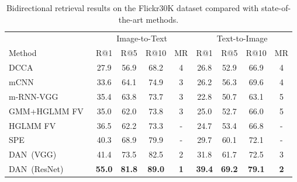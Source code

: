 \documentclass[10pt,twocolumn,letterpaper]{article}
\begin{document}
\begin{table*}
\caption{
Bidirectional retrieval results on the Flickr30K dataset compared with state-of-the-art methods.
}
\vspace{-2mm}
  \centering
  \begin{tabular}{lcccccccc}
    \toprule
	& \multicolumn{4}{c}{Image-to-Text}
	& \multicolumn{4}{c}{Text-to-Image} \\
    \cmidrule(lr){2-5} \cmidrule(lr){6-9}
	{Method}
	& {R@1} & {R@5} & {R@10} & {MR}
	& {R@1} & {R@5} & {R@10} & {MR}  \\
    \midrule
	{DCCA~\cite{yan2015deep}}
	& {27.9} & {56.9} & {68.2} & {4}
	& {26.8} & {52.9} & {66.9} & {4} \\
	{mCNN~\cite{ma2015multimodal}}
	& {33.6} & {64.1} & {74.9} & {3}
	& {26.2} & {56.3} & {69.6} & {4} \\
	{m-RNN-VGG~\cite{mao2015deep}}
	& {35.4} & {63.8} & {73.7} & {3}
	& {22.8} & {50.7} & {63.1} & {5} \\
	{GMM+HGLMM FV~\cite{klein2015associating}}
	& {35.0} & {62.0} & {73.8} & {3}
	& {25.0} & {52.7} & {66.0} & {5} \\
	{HGLMM FV~\cite{plummer2015flickr30k}}
	& {36.5} & {62.2} & {73.3} & {-}
	& {24.7} & {53.4} & {66.8} & {-} \\
	{SPE~\cite{wang2016learning}}
	& {40.3} & {68.9} & {79.9} & {-}
	& {29.7} & {60.1} & {72.1} & {-} \\
    \midrule
	{DAN\ (VGG)}
	& {41.4} & {73.5} & {82.5} & {2}
	& {31.8} & {61.7} & {72.5} & {3} \\
	{DAN\ (ResNet)}
	& {\bf{55.0}} & {\bf{81.8}} & {\bf{89.0}} & {\bf{1}}
	& {\bf{39.4}} & {\bf{69.2}} & {\bf{79.1}} & {\bf{2}} \\
    \hline
  \end{tabular}
\label{tab:matching}
\vspace{-3mm}
\end{table*}
\end{document}
